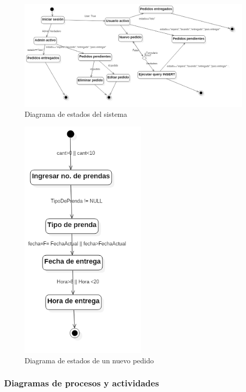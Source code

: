 \begin{figure}[htb]
\begin{center}
\includegraphics[width=18cm]{./imagenes/diagramas/Estado_lavanderia.png}
\end{center}
\caption{Diagrama de estados del sistema}
\end{figure}


\begin{figure}[htb]
\begin{center}
\includegraphics[width=6cm]{./imagenes/diagramas/Estados_lavanderia2.png}
\end{center}
\caption{Diagrama de estados de un nuevo pedido}
\end{figure}


\newpage



\subsubsection{Diagramas de procesos y actividades}


